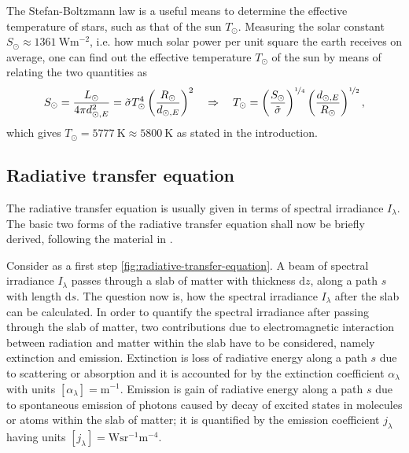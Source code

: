 \documentclass[a4paper,12pt]{report}
\begin{document}
The Stefan-Boltzmann law is a useful means to determine the effective temperature of stars, such as that of the sun $T_\odot$. Measuring the solar constant $S_\odot \approx \SI{1361}{\watt\meter^{-2}}$, i.e. how much solar power per unit square the earth receives on average, one can find out the effective temperature $T_\odot$ of the sun by means of relating the two quantities as \begin{equation}
S_\odot = \frac{L_\odot}{4\pi d_{\odot,E}^2} = \tilde{\sigma}T_\odot^4\left(\frac{R_\odot}{d_{\odot,E}}\right)^2 \quad \Rightarrow \quad T_{\odot} = \left(\frac{S_\odot}{\tilde{\sigma}}\right)^{\nicefrac{1}{4}}\left(\frac{d_{\odot,E}}{R_\odot}\right)^{\nicefrac{1}{2}},
\end{equation} which gives $T_\odot = \SI{5777}{\kelvin} \approx \SI{5800}{\kelvin}$ as stated in the introduction. 

\subsection{Radiative transfer equation}
The radiative transfer equation is usually given in terms of spectral irradiance $I_\lambda$. The basic two forms of the radiative transfer equation shall now be briefly derived, following the material in \cite[pp.27-40]{Rutten.2015}.

Consider as a first step \cref{fig:radiative-transfer-equation}. A beam of spectral irradiance $I_\lambda$ passes through a slab of matter with thickness $\mathrm{d}z$, along a path $s$ with length $\mathrm{d}s$. The question now is, how the spectral irradiance $I_\lambda$ after the slab can be calculated. In order to quantify the spectral irradiance after passing through the slab of matter, two contributions due to electromagnetic interaction between radiation and matter within the slab have to be considered, namely extinction and emission. Extinction is loss of radiative energy along a path $s$ due to scattering or absorption and it is accounted for by the extinction coefficient $\alpha_\lambda$ with units $[\alpha_\lambda] = \si{\meter^{-1}}$. Emission is gain of radiative energy along a path $s$ due to spontaneous emission of photons caused by decay of excited states in molecules or atoms within the slab of matter; it is quantified by the emission coefficient $j_\lambda$ having units $[j_\lambda] = \si{\watt\steradian^{-1}\meter^{-4}}$.
\end{document}
